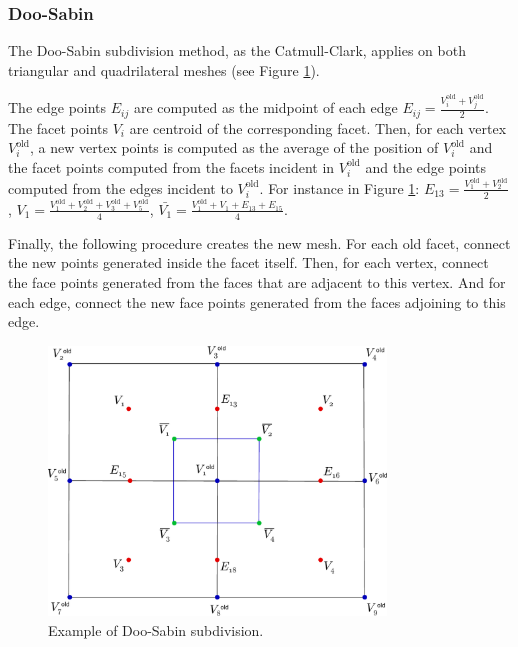 \subsubsection{Doo-Sabin}

The Doo-Sabin subdivision method, as the Catmull-Clark, applies on both triangular and quadrilateral meshes (see Figure \ref{fig:subdivisionDoo}).

The edge points $E_{ij}$ are computed as the midpoint of each edge $E_{ij} = \frac{V_i^{\text{old}} + V_j^{\text{old}}}{2}$. 
The facet points $V_i$ are centroid of the corresponding facet. 
Then, for each vertex $V_i^{\text{old}}$, a new vertex points is computed as the average of the position of $V_i^{\text{old}}$ and the facet points computed from the facets incident in $V_i^{\text{old}}$ and the edge points computed from the edges incident to $V_i^{\text{old}}$. 
For instance in Figure \ref{fig:subdivisionDoo}:
$
E_{13} = \frac{V_1^{\text{old}} + V_2^{\text{old}}}{2}
$, 
$
V_1 = \frac{V_1^{\text{old}} + V_2^{\text{old}} + V_3^{\text{old}} + V_5^{\text{old}}}{4}
$, 
$
\bar{V_1} = \frac{V_1^{\text{old}}  + V_1 + E_{13} + E_{15}}{4}
$.

Finally, the following procedure creates the new mesh. 
For each old facet, connect the new points generated inside the facet itself.
Then, for each vertex, connect the face points generated from the faces that are adjacent to this vertex. 
And for each edge, connect the new face points generated from the faces adjoining to this edge. 



\begin{figure}
\begin{center}
\centering
  \includegraphics[width=0.8\textwidth]{./img/subdivisiondoo}
 \caption{Example of Doo-Sabin subdivision.}
 \label{fig:subdivisionDoo}
\end{center}
\end{figure}




